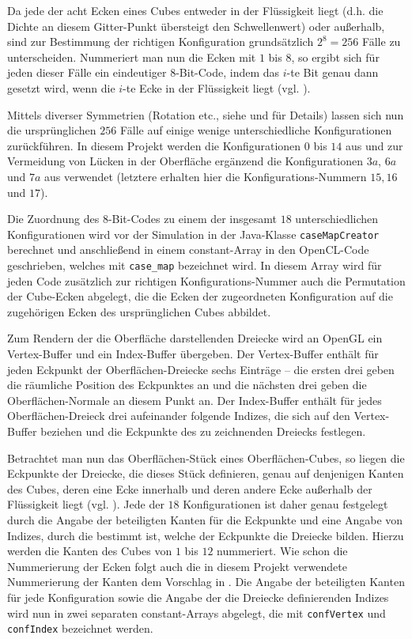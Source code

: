 \noindent Da jede der acht Ecken eines Cubes entweder in der Flüssigkeit liegt (d.h. die Dichte an diesem Gitter-Punkt übersteigt den Schwellenwert) oder außerhalb, sind zur Bestimmung der richtigen Konfiguration grundsätzlich $2^8 = 256$ Fälle zu unterscheiden. Nummeriert man nun die Ecken mit $1$ bis $8$, so ergibt sich für jeden dieser Fälle ein eindeutiger $8$-Bit-Code, indem das $i$-te Bit genau dann gesetzt wird, wenn die $i$-te Ecke in der Flüssigkeit liegt (vgl. \cite[S. 165]{MC}).
\smallskip

\noindent Mittels diverser Symmetrien (Rotation etc., siehe \cite{MC} und \cite{MCADD} für Details) lassen sich nun die ursprünglichen $256$ Fälle auf einige wenige unterschiedliche Konfigurationen zurückführen. In diesem Projekt werden die Konfigurationen $0$ bis $14$ aus \cite[S. 165]{MC} und zur Vermeidung von Lücken in der Oberfläche ergänzend die Konfigurationen $3a$, $6a$ und $7a$ aus \cite[S. 247]{MCADD} verwendet (letztere erhalten hier die Konfigurations-Nummern $15, 16$ und $17$).
\smallskip

\noindent Die Zuordnung des 8-Bit-Codes zu einem der insgesamt $18$ unterschiedlichen Konfigurationen wird vor der Simulation in der Java-Klasse {\tt caseMapCreator} berechnet und anschließend in einem constant-Array in den OpenCL-Code geschrieben, welches mit {\tt case\_map} bezeichnet wird. In diesem Array wird für jeden Code zusätzlich zur richtigen Konfigurations-Nummer auch die Permutation der Cube-Ecken abgelegt, die die Ecken der zugeordneten Konfiguration auf die zugehörigen Ecken des ursprünglichen Cubes abbildet.
\smallskip

\noindent Zum Rendern der die Oberfläche darstellenden Dreiecke wird an OpenGL ein Vertex-Buffer und ein Index-Buffer übergeben. Der Vertex-Buffer enthält für jeden Eckpunkt der Oberflächen-Dreiecke sechs Einträge -- die ersten drei geben die räumliche Position des Eckpunktes an und die nächsten drei geben die Oberflächen-Normale an diesem Punkt an. Der Index-Buffer enthält für jedes Oberflächen-Dreieck drei aufeinander folgende Indizes, die sich auf den Vertex-Buffer beziehen und die Eckpunkte des zu zeichnenden Dreiecks festlegen.
\smallskip

\noindent Betrachtet man nun das Oberflächen-Stück eines Oberflächen-Cubes, so liegen die Eckpunkte der Dreiecke, die dieses Stück definieren, genau auf denjenigen Kanten des Cubes, deren eine Ecke innerhalb und deren andere Ecke außerhalb der Flüssigkeit liegt (vgl. \cite[S. 164]{MC}). Jede der $18$ Konfigurationen ist daher genau festgelegt durch die Angabe der beteiligten Kanten für die Eckpunkte und eine Angabe von Indizes, durch die bestimmt ist, welche der Eckpunkte die Dreiecke bilden. Hierzu werden die Kanten des Cubes von $1$ bis $12$ nummeriert. Wie schon die Nummerierung der Ecken folgt auch die in diesem Projekt verwendete Nummerierung der Kanten dem Vorschlag in \cite[S. 165]{MC}. Die Angabe der beteiligten Kanten für jede Konfiguration sowie die Angabe der die Dreiecke definierenden Indizes wird nun in zwei separaten constant-Arrays abgelegt, die mit {\tt confVertex} und {\tt confIndex} bezeichnet werden.
\smallskip

